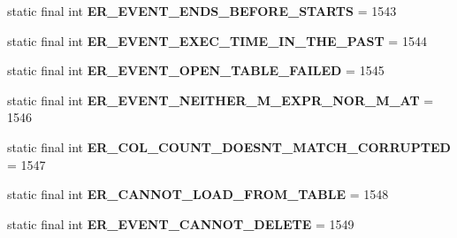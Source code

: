 \begin{DoxyCompactItemize}
\item 
\mbox{\label{classcom_1_1mysql_1_1jdbc_1_1_mysql_error_numbers_a4d7ccba6ae6533064496d809ecee806e}} 
static final int {\bfseries E\+R\+\_\+\+E\+V\+E\+N\+T\+\_\+\+E\+N\+D\+S\+\_\+\+B\+E\+F\+O\+R\+E\+\_\+\+S\+T\+A\+R\+TS} = 1543
\item 
\mbox{\label{classcom_1_1mysql_1_1jdbc_1_1_mysql_error_numbers_a91cc18ca54e3f0755ce1075063e87d13}} 
static final int {\bfseries E\+R\+\_\+\+E\+V\+E\+N\+T\+\_\+\+E\+X\+E\+C\+\_\+\+T\+I\+M\+E\+\_\+\+I\+N\+\_\+\+T\+H\+E\+\_\+\+P\+A\+ST} = 1544
\item 
\mbox{\label{classcom_1_1mysql_1_1jdbc_1_1_mysql_error_numbers_ab7cf628576ff0e9ecbd7d2e353e9cacb}} 
static final int {\bfseries E\+R\+\_\+\+E\+V\+E\+N\+T\+\_\+\+O\+P\+E\+N\+\_\+\+T\+A\+B\+L\+E\+\_\+\+F\+A\+I\+L\+ED} = 1545
\item 
\mbox{\label{classcom_1_1mysql_1_1jdbc_1_1_mysql_error_numbers_a3413ccc91e81a8126bbd56cfa787d6d0}} 
static final int {\bfseries E\+R\+\_\+\+E\+V\+E\+N\+T\+\_\+\+N\+E\+I\+T\+H\+E\+R\+\_\+\+M\+\_\+\+E\+X\+P\+R\+\_\+\+N\+O\+R\+\_\+\+M\+\_\+\+AT} = 1546
\item 
\mbox{\label{classcom_1_1mysql_1_1jdbc_1_1_mysql_error_numbers_affd4fc2f67a1f64bf672642bdf6547bb}} 
static final int {\bfseries E\+R\+\_\+\+C\+O\+L\+\_\+\+C\+O\+U\+N\+T\+\_\+\+D\+O\+E\+S\+N\+T\+\_\+\+M\+A\+T\+C\+H\+\_\+\+C\+O\+R\+R\+U\+P\+T\+ED} = 1547
\item 
\mbox{\label{classcom_1_1mysql_1_1jdbc_1_1_mysql_error_numbers_a0156229d979146344dbead60e2a51f24}} 
static final int {\bfseries E\+R\+\_\+\+C\+A\+N\+N\+O\+T\+\_\+\+L\+O\+A\+D\+\_\+\+F\+R\+O\+M\+\_\+\+T\+A\+B\+LE} = 1548
\item 
\mbox{\label{classcom_1_1mysql_1_1jdbc_1_1_mysql_error_numbers_aac69cddbb31dea226e574e5c0702f44e}} 
static final int {\bfseries E\+R\+\_\+\+E\+V\+E\+N\+T\+\_\+\+C\+A\+N\+N\+O\+T\+\_\+\+D\+E\+L\+E\+TE} = 1549

\end{DoxyCompactItemize}
